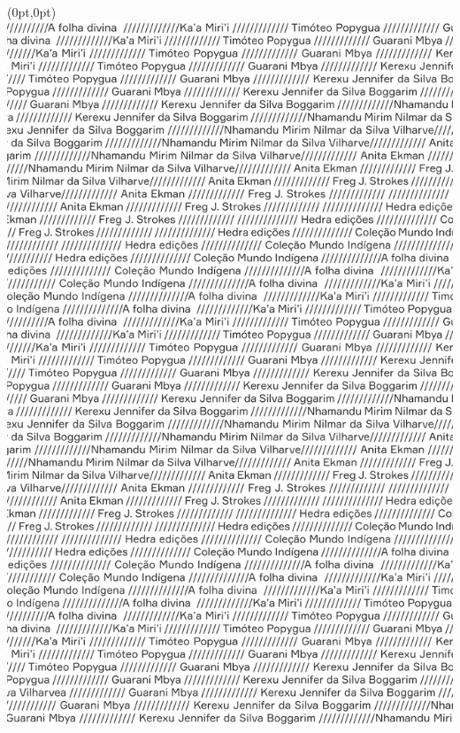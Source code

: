 \thispagestyle{empty}
\begin{textblock*}{2.625in}(0pt,0pt)%
\vspace*{-2.4cm}
\hspace*{-2.65cm}\includegraphics[width=138mm]{./ABERTURA.png}  
\end{textblock*}
\clearpage
\pagebreak

